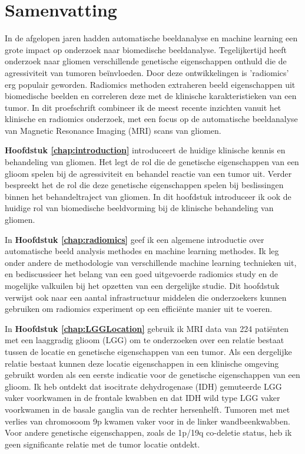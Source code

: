 \chapter{Samenvatting}
\begin{ChapterAbstractNoTitle}
\end{ChapterAbstractNoTitle}

In de afgelopen jaren hadden automatische beeldanalyse en machine learning een grote impact op onderzoek naar biomedische beeldanalyse.
Tegelijkertijd heeft onderzoek naar gliomen verschillende genetische eigenschappen onthuld die de agressiviteit van tumoren beïnvloeden.
Door deze ontwikkelingen is 'radiomics' erg populair geworden.
Radiomics methoden extraheren beeld eigenschappen uit biomedische beelden en correleren deze met de klinische karakteristieken van een tumor.
In dit proefschrift combineer ik de meest recente inzichten vanuit het klinische en radiomics onderzoek, met een focus op de automatische beeldanalyse van Magnetic Resonance Imaging (MRI) scans van gliomen.


\textbf{Hoofdstuk \ref{chap:introduction}} introduceert de huidige klinische kennis en behandeling van gliomen.
Het legt de rol die de genetische eigenschappen van een glioom spelen bij de agressiviteit en behandel reactie van een tumor uit.
Verder bespreekt het de rol die deze genetische eigenschappen spelen bij beslissingen binnen het behandeltraject van gliomen.
In dit hoofdstuk introduceer ik ook de huidige rol van biomedische beeldvorming bij de klinische behandeling van gliomen.

In \textbf{Hoofdstuk \ref{chap:radiomics}} geef ik een algemene introductie over automatische beeld analysis methodes en machine learning methodes.
Ik leg onder andere de methodologie van verschillende machine learning technieken uit, en bediscussieer het belang van een goed uitgevoerde radiomics study en de mogelijke valkuilen bij het opzetten van een dergelijke studie.
Dit hoofdstuk verwijst ook naar een aantal infrastructuur middelen die onderzoekers kunnen gebruiken om radiomics experiment op een efficiënte manier uit te voeren.

In \textbf{Hoofdstuk \ref{chap:LGGLocation}} gebruik ik MRI data van 224 patiënten met een  laaggradig glioom (LGG) om te onderzoeken over een relatie bestaat tussen de locatie en genetische eigenschappen van een tumor.
Als een dergelijke relatie bestaat kunnen deze locatie eigenschappen in een klinische omgeving gebruikt worden als een eerste indicatie voor de genetische eigenschappen van een glioom.
Ik heb ontdekt dat isocitrate dehydrogenase (IDH) gemuteerde LGG vaker voorkwamen in de frontale kwabben en dat IDH wild type LGG vaker voorkwamen in de basale ganglia van de rechter hersenhelft.
Tumoren met met verlies van chromosoom 9p kwamen vaker voor in de linker wandbeenkwabben.
Voor andere genetische eigenschappen, zoals de 1p/19q co-deletie status, heb ik geen significante relatie met de tumor locatie ontdekt.

